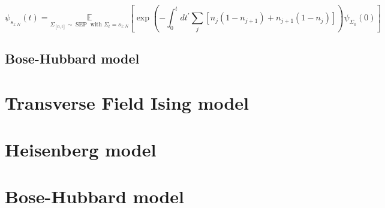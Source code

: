 \begin{equation}
	\psi_{s_{1: N}}(t)=\underset{\Sigma_{[0, t]} \sim \operatorname{SEP} \text{ with } \Sigma_{t}=s_{1: N}}{\mathbb{E}}
	\left[\exp \left(-\int_{0}^{t} d t^{\prime} \sum_{j}\left[n_{j}\left(1-n_{j+1}\right)+n_{j+1}\left(1-n_{j}\right)\right]\right) \psi_{\Sigma_{0}}(0)\right]
\end{equation}

\subsection{Bose-Hubbard model}

\section{Transverse Field Ising model}
\label{sec:res-im}

\section{Heisenberg model}
\label{sec:res-hm}

\section{Bose-Hubbard model}
\label{sec:res-bhm}

